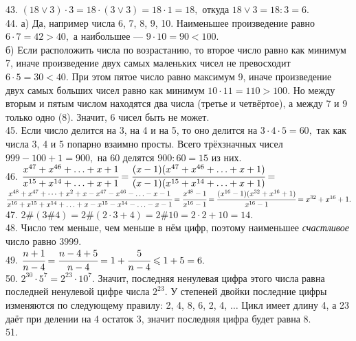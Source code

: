 43. $(18\vee 3)\cdot3=18\cdot(3\vee3)=18\cdot1=18,$ откуда $18\vee3=18:3=6.$\\
44. а) Да, например числа 6, 7, 8, 9, 10. Наименьшее произведение равно $6\cdot7=42>40,$ а наибольшее --- $9\cdot10=90<100.$\\
б) Если расположить числа по возрастанию, то второе число равно как минимум 7, иначе произведение двух самых маленьких чисел не превосходит $6\cdot5=30<40.$ При этом пятое число равно максимум 9, иначе произведение двух самых больших чисел равно как минимум $10\cdot11=110>100.$ Но между вторым и пятым числом находятся два числа (третье и четвёртое), а между 7 и 9 только одно (8). Значит, 6 чисел быть не может.\\
45. Если число делится на 3, на 4 и на 5, то оно делится на $3\cdot4\cdot5=60,$ так как числа 3, 4 и 5 попарно взаимно просты. Всего трёхзначных чисел $999-100+1=900,$ на 60 делятся $900:60=15$ из них.\\
46. $\cfrac{x^{47}+x^{46}+\ldots+x+1}{x^{15}+x^{14}+\ldots+x+1}=\cfrac{(x-1)(x^{47}+x^{46}+\ldots+x+1)}{(x-1)(x^{15}+x^{14}+\ldots+x+1)}=$\\$
\cfrac{x^{48}+x^{47}+\cdots+x^2+x-x^{47}-x^{46}-\ldots-x-1}{x^{16}+x^{15}+x^{14}+\ldots+x-x^{15}-x^{14}-\ldots-x-1}=\cfrac{x^{48}-1}{x^{16}-1}=
\cfrac{(x^{16}-1)(x^{32}+x^{16}+1)}{x^{16}-1}=x^{32}+x^{16}+1.$\\
47. $2\#(3\#4)=2\#(2\cdot3+4)=2\#10=2\cdot2+10=14.$\\
48. Число тем меньше, чем меньше в нём цифр, поэтому наименьшее {\it счастливое} число равно 3999.\\
49. $\cfrac{n+1}{n-4}=\cfrac{n-4+5}{n-4}=1+\cfrac{5}{n-4}\leqslant1+5=6.$\\
50. $2^{30}\cdot5^7=2^{23}\cdot10^7.$ Значит, последняя ненулевая цифра этого числа равна последней ненулевой цифре числа $2^{23}.$ У степеней двойки последние цифры изменяются по следующему правилу: 2, 4, 8, 6, 2, 4, $\ldots$ Цикл имеет длину 4, а 23 даёт при делении на 4 остаток 3, значит последняя цифра будет равна 8.\\
51.
\begin{figure}[ht!]
\end{figure}\\
